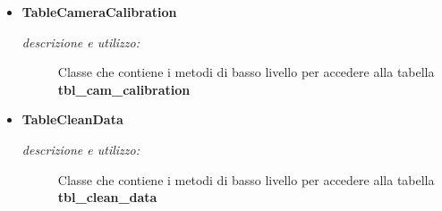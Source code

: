 \begin{itemize}
\item \textbf{TableCameraCalibration}
\begin{description}
\item [\textit{descrizione e utilizzo:}] Classe che contiene i metodi di basso livello per accedere alla tabella \textbf{tbl_cam_calibration}
\end{description}
\item \textbf{TableCleanData}
\begin{description}
\item [\textit{descrizione e utilizzo:}] Classe che contiene i metodi di basso livello per accedere alla tabella \textbf{tbl_clean_data}
\end{description}
\end{itemize}

